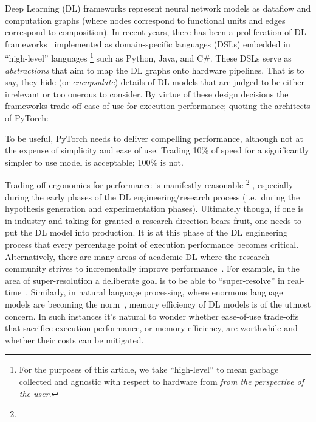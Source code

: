 \documentclass[sigconf]{acmart}
\begin{document}
Deep Learning (DL) frameworks represent neural network models as dataflow and computation graphs (where nodes correspond to functional units and edges correspond to composition).
In recent years, there has been a proliferation of DL frameworks~\cite{paszke2019pytorch,abadi2016tensorflow,chen2015mxnet,cntk} implemented as domain-specific languages (DSLs) embedded in ``high-level'' languages%
\footnote{For the purposes of this article, we take ``high-level'' to mean garbage collected and agnostic with respect to hardware from \textit{from the perspective of the user}.} such as Python, Java, and C\#.
These DSLs serve as \textit{abstractions} that aim to map the DL graphs onto hardware pipelines.
That is to say, they hide (or \textit{encapsulate}) details of DL models that are judged to be either irrelevant or too onerous to consider.
By virtue of these design decisions the frameworks trade-off ease-of-use for execution performance;
quoting the architects of PyTorch:
\begin{displayquote}
  To be useful, PyTorch needs to deliver compelling performance, although not at the expense of simplicity and ease of use.
  Trading 10\% of speed for a significantly simpler to use model is acceptable; 100\% is not.
\end{displayquote}

Trading off ergonomics for performance is manifestly reasonable%
\footnote{}%
, especially during the early phases of the DL engineering/research process (i.e.\ during the hypothesis generation and experimentation phases).
Ultimately though, if one is in industry and taking for granted a research direction bears fruit, one needs to put the DL model into production.
It is at this phase of the DL engineering process that every percentage point of execution performance becomes critical.
Alternatively, there are many areas of academic DL where the research community strives to incrementally improve performance~\cite{abdelhamed2020ntire,hall2020probability,ILSVRC15}.
For example, in the area of super-resolution a deliberate goal is to be able to ``super-resolve'' in real-time~\cite{7780576}.
Similarly, in natural language processing, where enormous language models are becoming the norm~\cite{brown2020language}, memory efficiency of DL models is of the utmost concern.
In such instances it's natural to wonder whether ease-of-use trade-offs that sacrifice execution performance, or memory efficiency, are worthwhile and whether their costs can be mitigated.
\end{document}
